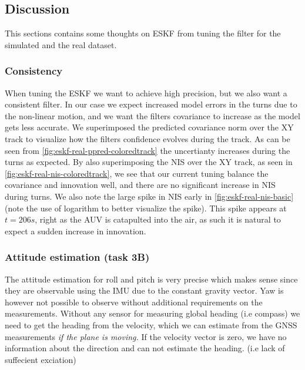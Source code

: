 \subsection{Discussion}
This sections contains some thoughts on ESKF from tuning the filter for the simulated and the real dataset.



\subsubsection{Consistency}
When tuning the ESKF we want to achieve high precision, but we also want a consistent filter. In our case we expect increased model errors in the turns due to the non-linear motion, and we want the filters covariance to increase as the model gets less accurate. We superimposed the predicted covariance norm over the XY track to visualize how the filters confidence evolves during the track. As can be seen from \cref{fig:eskf-real-ppred-coloredtrack} the uncertianty increases during the turns as expected. By also superimposing the NIS over the XY track, as seen in \cref{fig:eskf-real-nis-coloredtrack}, we see that our current tuning balance the covariance and innovation well, and there are no significant increase in NIS during turns. 
We also note the large spike in NIS early in \cref{fig:eskf-real-nis-basic} (note the use of logarithm to better visualize the spike). This spike appears at $t=206s$, right as the AUV is catapulted into the air, as such it is natural to expect a sudden increase in innovation.

\subsubsection{Attitude estimation (task 3B)}
The attitude estimation for roll and pitch is very precise which makes sense since they are observable using the IMU due to the constant gravity vector. Yaw is however not possible to observe without additional requirements on the measurements. Without any sensor for measuring global heading (i.e compass) we need to get the heading from the velocity, which we can estimate from the GNSS measurements \textit{if the plane is moving.} If the velocity vector is zero, we have no information about the direction and can not estimate the heading. (i.e lack of suffecient exciation) 

